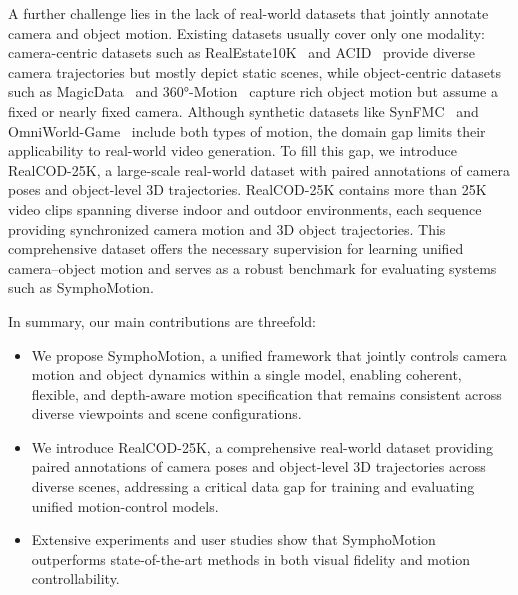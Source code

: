 A further challenge lies in the lack of real-world datasets that jointly annotate camera and object motion. Existing datasets usually cover only one modality: camera-centric datasets such as RealEstate10K~\cite{zhou2018stereo} and ACID~\cite{xiao2021development} provide diverse camera trajectories but mostly depict static scenes, while object-centric datasets such as MagicData~\cite{li2025magicmotion} and 360°-Motion~\cite{fu20243dtrajmaster} capture rich object motion but assume a fixed or nearly fixed camera. Although synthetic datasets like SynFMC~\cite{shuai2025free} and OmniWorld-Game~\cite{zhou2025omniworld} include both types of motion, the domain gap limits their applicability to real-world video generation.
To fill this gap, we introduce RealCOD-25K, a large-scale real-world dataset with paired annotations of camera poses and object-level 3D trajectories. RealCOD-25K contains more than 25K video clips spanning diverse indoor and outdoor environments, each sequence providing synchronized camera motion and 3D object trajectories. This comprehensive dataset offers the necessary supervision for learning unified camera–object motion and serves as a robust benchmark for evaluating systems such as SymphoMotion.

In summary, our main contributions are threefold:
\begin{itemize}
  \item 
  We propose SymphoMotion, a unified framework that jointly controls camera motion and object dynamics within a single model, enabling coherent, flexible, and depth-aware motion specification that remains consistent across diverse viewpoints and scene configurations.
  \item We introduce RealCOD-25K, 
  a comprehensive real-world dataset providing paired annotations of camera poses and object-level 3D trajectories across diverse scenes, addressing a critical data gap for training and evaluating unified motion-control models.
  \item Extensive experiments and user studies show that SymphoMotion outperforms state-of-the-art methods in both visual fidelity and motion controllability.
\end{itemize}
